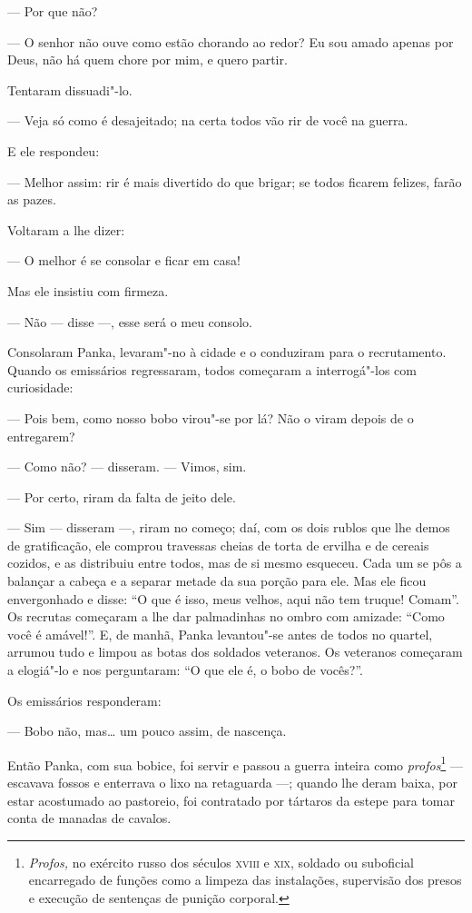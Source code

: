 --- Por que não?

--- O senhor não ouve como estão chorando ao redor? Eu sou amado apenas
por Deus, não há quem chore por mim, e quero partir.

Tentaram dissuadi"-lo.

--- Veja só como é desajeitado; na certa todos vão rir de você na
guerra.

E ele respondeu:

--- Melhor assim: rir é mais divertido do que brigar; se todos ficarem
felizes, farão as pazes.

Voltaram a lhe dizer:

--- O melhor é se consolar e ficar em casa!

Mas ele insistiu com firmeza.

--- Não --- disse ---, esse será o meu consolo.

Consolaram Panka, levaram"-no à cidade e o conduziram para o
recrutamento. Quando os emissários regressaram, todos começaram a
interrogá"-los com curiosidade:

--- Pois bem, como nosso bobo virou"-se por lá? Não o viram depois de o
entregarem?

--- Como não? --- disseram. --- Vimos, sim.

--- Por certo, riram da falta de jeito dele.

--- Sim --- disseram ---, riram no começo; daí, com os dois rublos que
lhe demos de gratificação, ele comprou travessas cheias de torta de
ervilha e de cereais cozidos, e as distribuiu entre todos, mas de si
mesmo esqueceu. Cada um se pôs a balançar a cabeça e a separar metade da
sua porção para ele. Mas ele ficou envergonhado e disse: ``O que é isso,
meus velhos, aqui não tem truque! Comam''. Os recrutas começaram a lhe
dar palmadinhas no ombro com amizade: ``Como você é amável!''. E, de
manhã, Panka levantou"-se antes de todos no quartel, arrumou tudo e
limpou as botas dos soldados veteranos. Os veteranos começaram a
elogiá"-lo e nos perguntaram: ``O que ele é, o bobo de vocês?''.

Os emissários responderam:

--- Bobo não, mas\ldots{} um pouco assim, de nascença.

Então Panka, com sua bobice, foi servir e passou a guerra inteira como
\emph{profos}\footnote{\emph{Profos,} no exército russo dos séculos
  \textsc{xviii} e \textsc{xix}, soldado ou suboficial encarregado de funções como a
  limpeza das instalações, supervisão dos presos e execução de sentenças
  de punição corporal.} --- escavava fossos e enterrava o lixo na
retaguarda ---; quando lhe deram baixa, por estar acostumado ao
pastoreio, foi contratado por tártaros da estepe para tomar conta de
manadas de cavalos.


